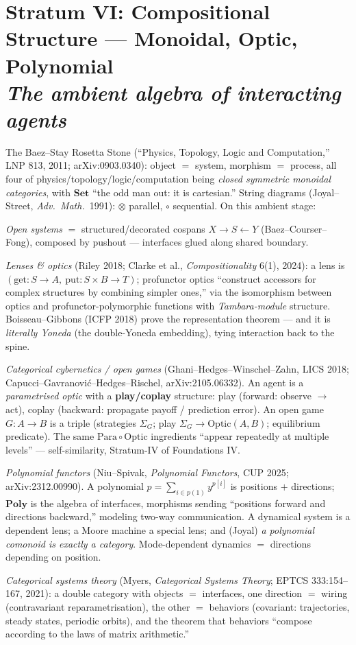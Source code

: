 \documentclass[11pt]{article}
\theoremstyle{plain}
\theoremstyle{definition}
\theoremstyle{remark}
\newcommand{\Set}{\mathbf{Set}}
\newcommand{\Poly}{\mathbf{Poly}}
\newcommand{\stratum}[2]{\section{#1\\ {\normalsize\normalfont\itshape #2}}}
\begin{document}
\stratum{Stratum VI: Compositional Structure --- Monoidal, Optic, Polynomial}{The ambient algebra of interacting agents}

The Baez--Stay Rosetta Stone (``Physics, Topology, Logic and Computation,'' LNP 813, 2011; arXiv:0903.0340): object $=$ system, morphism $=$ process, all four of physics/topology/logic/computation being \emph{closed symmetric monoidal categories}, with $\Set$ ``the odd man out: it is cartesian.'' String diagrams (Joyal--Street, \emph{Adv.\ Math.}\ 1991): $\otimes$ parallel, $\circ$ sequential. On this ambient stage:

\emph{Open systems} $=$ structured/decorated cospans $X \to S \leftarrow Y$ (Baez--Courser--Fong), composed by pushout --- interfaces glued along shared boundary.

\emph{Lenses \& optics} (Riley 2018; Clarke et al., \emph{Compositionality} 6(1), 2024): a lens is $(\mathrm{get}\colon S\to A,\ \mathrm{put}\colon S\times B\to T)$; profunctor optics ``construct accessors for complex structures by combining simpler ones,'' via the isomorphism between optics and profunctor-polymorphic functions with \emph{Tambara-module} structure. Boisseau--Gibbons (ICFP 2018) prove the representation theorem --- and it is \emph{literally Yoneda} (the double-Yoneda embedding), tying interaction back to the spine.

\emph{Categorical cybernetics / open games} (Ghani--Hedges--Winschel--Zahn, LICS 2018; Capucci--Gavranovi\'c--Hedges--Rischel, arXiv:2105.06332). An agent is a \emph{parametrised optic} with a \textbf{play/coplay} structure: play (forward: observe $\to$ act), coplay (backward: propagate payoff / prediction error). An open game $G\colon A\to B$ is a triple (strategies $\Sigma_G$; play $\Sigma_G \to \mathrm{Optic}(A,B)$; equilibrium predicate). The same $\mathrm{Para}\circ\mathrm{Optic}$ ingredients ``appear repeatedly at multiple levels'' --- self-similarity, Stratum-IV of Foundations IV.

\emph{Polynomial functors} (Niu--Spivak, \emph{Polynomial Functors}, CUP 2025; arXiv:2312.00990). A polynomial $p=\sum_{i\in p(1)} y^{p[i]}$ is positions $+$ directions; $\Poly$ is the algebra of interfaces, morphisms sending ``positions forward and directions backward,'' modeling two-way communication. A dynamical system is a dependent lens; a Moore machine a special lens; and (Joyal) \emph{a polynomial comonoid is exactly a category}. Mode-dependent dynamics $=$ directions depending on position.

\emph{Categorical systems theory} (Myers, \emph{Categorical Systems Theory}; EPTCS 333:154--167, 2021): a double category with objects $=$ interfaces, one direction $=$ wiring (contravariant reparametrisation), the other $=$ behaviors (covariant: trajectories, steady states, periodic orbits), and the theorem that behaviors ``compose according to the laws of matrix arithmetic.''
\end{document}
